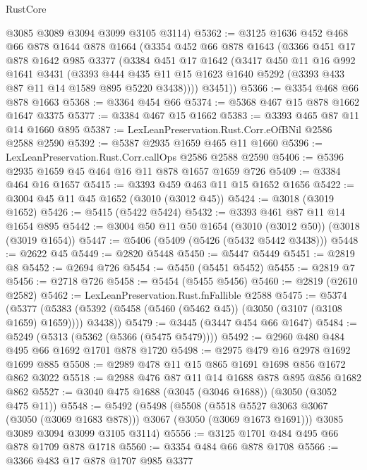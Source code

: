 \begin{lexlean}{RustCore}
\begin{coremodule}
      @3085
      @3089
      @3094
      @3099
      @3105
      @3114)
@5362 := @3125
    @1636
    @452
    @468
    @66
    @878
    @1644
    @878
    @1664
    (@3354
      @452
      @66
      @878
      @1643
      (@3366
        @451
        @17
        @878
        @1642
        @985
        @3377
        (@3384
          @451
          @17
          @1642
          (@3417
            @450
            @11
            @16
            @992
            @1641
            @3431
            (@3393
              @444
              @435
              @11
              @15
              @1623
              @1640
              @5292
              (@3393 @433 @87 @11 @14 @1589 @895 @5220 @3438))))
        @3451))
@5366 := @3354 @468 @66 @878 @1663
@5368 := @3364 @454 @66
@5374 := @5368 @467 @15 @878 @1662 @1647 @3375
@5377 := @3384 @467 @15 @1662
@5383 := @3393 @465 @87 @11 @14 @1660 @895
@5387 := LexLeanPreservation.Rust.Corr.eOfBNil @2586 @2588 @2590
@5392 := @5387 @2935 @1659 @465 @11 @1660
@5396 := LexLeanPreservation.Rust.Corr.callOps @2586 @2588 @2590
@5406 := @5396 @2935 @1659 @45 @464 @16 @11 @878 @1657 @1659 @726
@5409 := @3384 @464 @16 @1657
@5415 := @3393 @459 @463 @11 @15 @1652 @1656
@5422 := @3004 @45 @11 @45 @1652 (@3010 (@3012 @45))
@5424 := @3018 (@3019 @1652)
@5426 := @5415 (@5422 @5424)
@5432 := @3393 @461 @87 @11 @14 @1654 @895
@5442 := @3004 @50 @11 @50 @1654 (@3010 (@3012 @50)) (@3018 (@3019 @1654))
@5447 := @5406 (@5409 (@5426 (@5432 @5442 @3438)))
@5448 := @2622 @45
@5449 := @2820 @5448
@5450 := @5447 @5449
@5451 := @2819 @8
@5452 := @2694 @726
@5454 := @5450 (@5451 @5452)
@5455 := @2819 @7
@5456 := @2718 @726
@5458 := @5454 (@5455 @5456)
@5460 := @2819 (@2610 @2582)
@5462 := LexLeanPreservation.Rust.fnFallible @2588
@5475 := @5374
    (@5377 (@5383 (@5392 (@5458 (@5460 (@5462 @45)) (@3050 (@3107 (@3108 @1659) @1659)))) @3438))
@5479 := @3445 (@3447 @454 @66 @1647)
@5484 := @5249 (@5313 (@5362 (@5366 (@5475 @5479))))
@5492 := @2960 @480 @484 @495 @66 @1692 @1701 @878 @1720
@5498 := @2975 @479 @16 @2978 @1692 @1699 @885
@5508 := @2989 @478 @11 @15 @865 @1691 @1698 @856 @1672 @862 @3022
@5518 := @2988 @476 @87 @11 @14 @1688 @878 @895 @856 @1682 @862
@5527 := @3040 @475 @1688 (@3045 (@3046 @1688)) (@3050 (@3052 @475 @11))
@5548 := @5492
    (@5498
      (@5508 (@5518 @5527 @3063 @3067 (@3050 (@3069 @1683 @878))) @3067 (@3050 (@3069 @1673 @1691)))
      @3085
      @3089
      @3094
      @3099
      @3105
      @3114)
@5556 := @3125 @1701 @484 @495 @66 @878 @1709 @878 @1718
@5560 := @3354 @484 @66 @878 @1708
@5566 := @3366 @483 @17 @878 @1707 @985 @3377

\end{coremodule}
\end{lexlean}
